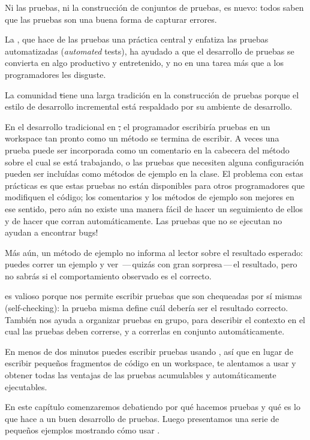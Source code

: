 \documentclass[a4paper,10pt,twoside]{book}
\begin{document}
Ni las pruebas, ni la construcci\'on de conjuntos de pruebas, es nuevo:  todos saben que  las pruebas son una buena forma de capturar errores.

La \mbox{,} que hace de las pruebas una pr\'actica central
y enfatiza las pruebas automatizadas (\emph{automated} tests), 
ha ayudado a que el desarrollo de pruebas se convierta en algo productivo y entretenido, y no en una tarea m\'as que a los programadores les disguste.

La comunidad \st tiene una larga tradici\'on en la construcci\'on de pruebas porque el estilo de desarrollo incremental est\'a respaldado por su ambiente de desarrollo.
  
En el desarrollo tradicional en \st , el programador escribir\'ia pruebas en un workspace 
tan pronto como un m\'etodo se termina de escribir.
A veces una prueba puede ser incorporada como un comentario en la cabecera
del m\'etodo sobre el cual se est\'a trabajando,
o las pruebas que necesiten alguna configuraci\'on pueden ser inclu\'idas como m\'etodos de ejemplo en la clase.
El problema con estas pr\'acticas es que estas pruebas no est\'an
disponibles para otros programadores que modifiquen el c\'odigo; los comentarios y los m\'etodos de ejemplo son mejores en ese sentido, pero a\'un no existe una manera f\'acil de hacer un seguimiento de ellos y de hacer que corran autom\'aticamente. \¡Las pruebas que no se ejecutan no ayudan a encontrar bugs!

M\'as a\'un, un m\'etodo de ejemplo no informa al lector sobre el resultado esperado:
puedes correr un ejemplo y ver \,---\,quiz\'as con gran sorpresa\,---\,el resultado, 
pero no sabr\'as si el comportamiento observado es el correcto.

\sunit es valioso porque nos permite escribir pruebas que son chequeadas por s\'i mismas (self-checking):
la prueba misma define cu\'al deber\'ia ser el resultado correcto.
Tambi\'en nos ayuda a organizar pruebas en grupo, para describir el contexto en el cual las pruebas deben correrse,
 y a correrlas en conjunto autom\'aticamente.

En menos de dos minutos puedes escribir pruebas usando \sunit, as\'i que en lugar de escribir peque\~nos fragmentos de c\'odigo en un workspace, te alentamos a usar \sunit y obtener todas las ventajas de las pruebas acumulables y autom\'aticamente ejecutables.

En este cap\'itulo comenzaremos debatiendo por qu\'e hacemos pruebas y qu\'e es lo que hace a un buen desarrollo de pruebas. Luego presentamos una serie de peque\~nos ejemplos mostrando c\'omo usar \sunit.
\end{document}
